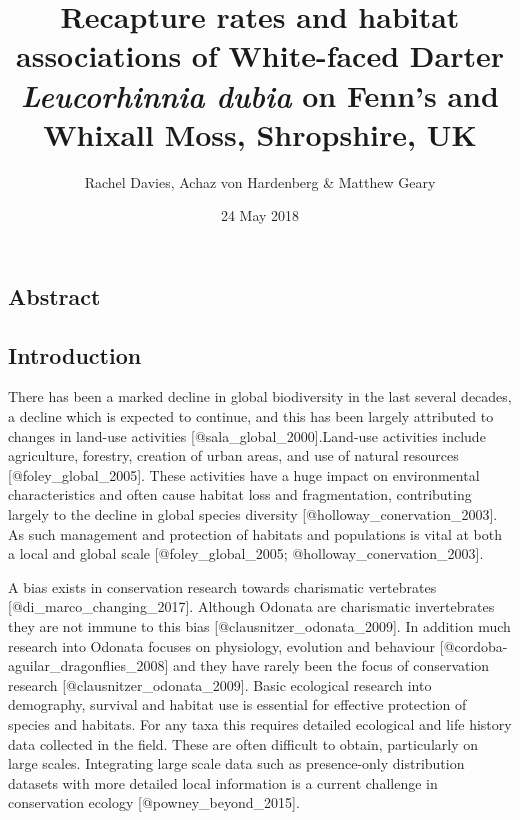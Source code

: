 \documentclass[]{article}
\title{Recapture rates and habitat associations of White-faced Darter
\emph{Leucorhinnia dubia} on Fenn's and Whixall Moss, Shropshire, UK}
\author{Rachel Davies, Achaz von Hardenberg \& Matthew Geary}
\date{24 May 2018}
\begin{document}
\maketitle

\subsection{Abstract}\label{abstract}

\subsection{Introduction}\label{introduction}

There has been a marked decline in global biodiversity in the last
several decades, a decline which is expected to continue, and this has
been largely attributed to changes in land-use activities
{[}@sala\_global\_2000{]}.Land-use activities include agriculture,
forestry, creation of urban areas, and use of natural resources
{[}@foley\_global\_2005{]}. These activities have a huge impact on
environmental characteristics and often cause habitat loss and
fragmentation, contributing largely to the decline in global species
diversity {[}@holloway\_conervation\_2003{]}. As such management and
protection of habitats and populations is vital at both a local and
global scale {[}@foley\_global\_2005; @holloway\_conervation\_2003{]}.

A bias exists in conservation research towards charismatic vertebrates
{[}@di\_marco\_changing\_2017{]}. Although Odonata are charismatic
invertebrates they are not immune to this bias
{[}@clausnitzer\_odonata\_2009{]}. In addition much research into
Odonata focuses on physiology, evolution and behaviour
{[}@cordoba-aguilar\_dragonflies\_2008{]} and they have rarely been the
focus of conservation research {[}@clausnitzer\_odonata\_2009{]}. Basic
ecological research into demography, survival and habitat use is
essential for effective protection of species and habitats. For any taxa
this requires detailed ecological and life history data collected in the
field. These are often difficult to obtain, particularly on large
scales. Integrating large scale data such as presence-only distribution
datasets with more detailed local information is a current challenge in
conservation ecology {[}@powney\_beyond\_2015{]}.
\end{document}
